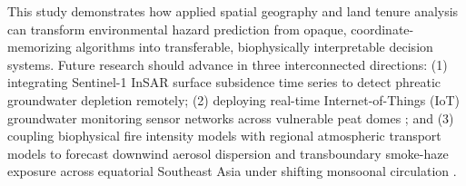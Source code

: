 This study demonstrates how applied spatial geography and land tenure analysis can transform environmental hazard prediction from opaque, coordinate-memorizing algorithms into transferable, biophysically interpretable decision systems. Future research should advance in three interconnected directions: (1) integrating Sentinel-1 InSAR surface subsidence time series to detect phreatic groundwater depletion remotely; (2) deploying real-time Internet-of-Things (IoT) groundwater monitoring sensor networks across vulnerable peat domes \citep{Dadap2021NatComm}; and (3) coupling biophysical fire intensity models with regional atmospheric transport models to forecast downwind aerosol dispersion and transboundary smoke-haze exposure across equatorial Southeast Asia under shifting monsoonal circulation \citep{Kiely2021ACP}.
